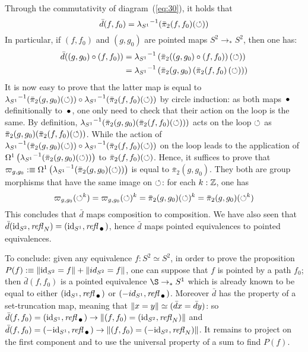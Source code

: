 \documentclass[english,a4]{article}
\newcommand{\Sp}{{S^2}}%
\newcommand{\Truncprop}[1]{\Trunc{#1}}%
\newcommand{\ptdto}{\to_\ast}%
\begin{document}
Through the commutativity of diagram~(\ref{eq:30}), it holds that
\begin{equation}
  \bar d(f,f_0) = {\lambda_{S^1}}^{-1}(\bar \pi_2(f,f_0)(\mathord{\circlearrowleft}))
\end{equation}
In particular, if $(f,f_0)$ and $(g,g_0)$ are pointed maps
$\Sp \ptdto \Sp$, then one has:
\begin{equation}
  \label{eq:37}
  \begin{aligned}
    \bar d ((g,g_0) \circ (f,f_0))
    &= {\lambda_{S^1}}^{-1} \left(
      \bar\pi_2((g,g_0) \circ (f,f_0))\left( \mathord{\circlearrowleft} \right)
    \right)
    \\
    &= {\lambda_{S^1}}^{-1} \left(
      \bar\pi_2(g,g_0)\left( \bar\pi_2(f,f_0)\left(  \mathord{\circlearrowleft} \right) \right)
    \right)
  \end{aligned}
\end{equation}
It is now easy to prove that the latter map is equal to
${\lambda_{S^1}}^{-1}(\bar \pi_2(g,g_0)(\mathord{\circlearrowleft})) \circ
{\lambda_{S^1}}^{-1}(\bar \pi_2(f,f_0)(\mathord{\circlearrowleft}))$ by circle induction: as
both maps $\base$ definitionally to $\base$, one only need to check
that their action on the loop is the same. By definition,
${\lambda_{S^1}}^{-1}(\bar \pi_2(g,g_0)(\bar\pi_2(f,f_0)(\mathord{\circlearrowleft})))$ acts
on the loop $\mathord{\circlearrowleft}$ as $\bar
\pi_2(g,g_0)(\bar\pi_2(f,f_0)(\mathord{\circlearrowleft}))$. While the action of
${\lambda_{S^1}}^{-1}(\bar \pi_2(g,g_0)(\mathord{\circlearrowleft})) \circ
{\lambda_{S^1}}^{-1}(\bar \pi_2(f,f_0)(\mathord{\circlearrowleft}))$ on the loop leads to the
application of
$\mathop{\Omega^{1}} \left({\lambda_{S^1}}^{-1}(\bar
  \pi_2(g,g_0)(\mathord{\circlearrowleft}))\right)$ to $\bar\pi_2(f,f_0)(\mathord{\circlearrowleft})$. Hence,
it suffices to prove that
$\varpi_{g,g_0} \mathrel{\hbox{:}\mkern-5mu\equiv}\mathop{\Omega^{1}} \left({\lambda_{S^1}}^{-1}(\bar
  \pi_2(g,g_0)(\mathord{\circlearrowleft}))\right)$ is equal to $\bar \pi_2(g,g_0)$. They
both are group morphisms that have the same image on $\mathord{\circlearrowleft}$: for
each
$k:\mathbb{Z}$, one has
\begin{equation}
  \label{eq:39}
  \varpi_{g,g_0} (\mathord{\circlearrowleft}^k) = \varpi_{g,g_0} (\mathord{\circlearrowleft})^k
  = \bar\pi_2(g,g_0)(\mathord{\circlearrowleft})^k = \bar\pi_2(g,g_0)(\mathord{\circlearrowleft}^k)
\end{equation}
This concludes that $\bar d$ maps composition to composition. We have
also seen that $\bar d (\id_\Sp,\refl N) = (\id_\Sc,\refl\base)$,
hence $\bar d$ maps pointed equivalences to pointed equivalences.

To conclude: given any equivalence $f:\Sp\simeq \Sp$, in order to
prove the proposition
$P(f)\defequi \Truncprop{\id_\Sp = f} + \Truncprop{\-id_\Sp = f}$, one
can suppose that $f$ is pointed by a path $f_0$; then $\bar d(f,f_0)$
is a pointed equivalence $\S \ptdto \Sc$ which is already known to be
equal to either $(\id_\Sc,\refl\base)$ or
$(-id_\Sc,\refl\base)$. Moreover $\bar d$ has the property of a
set-truncation map, meaning that
$\Truncprop{x=y} \weq (\bar d x = \bar d y)$: so
$\bar d(f,f_0) = (\id_\Sc,\refl \base) \to \Truncprop{(f,f_0) =
  (\id_\Sp,\refl N)}$ and
$\bar d(f,f_0) = (-\id_\Sc,\refl \base) \to \Truncprop{(f,f_0) =
  (-\id_\Sp,\refl N)}$. It remains to project on the first component
and to use the universal property of a sum to find $P(f)$.
\end{document}
